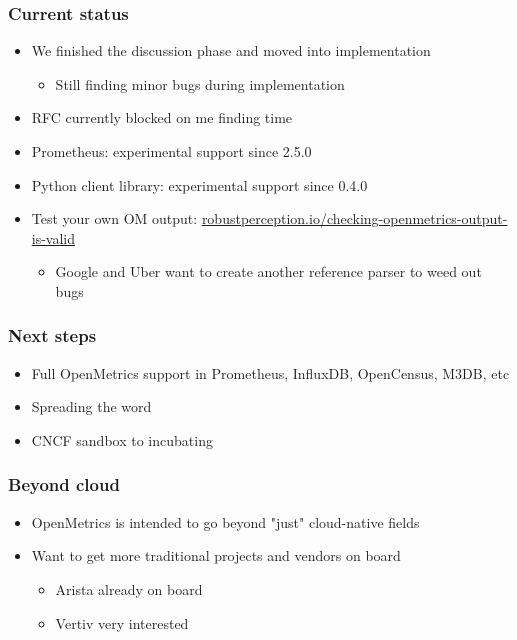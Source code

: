 \documentclass[aspectratio=169]{beamer}
\begin{document}
\begin{frame}
	\frametitle{Current status}
	\vfill
	\begin{itemize}
		\item We finished the discussion phase and moved into implementation
		\begin{itemize}
			\item Still finding minor bugs during implementation
		\end{itemize}
		\item RFC currently blocked on me finding time
		\item Prometheus: experimental support since 2.5.0
		\item Python client library: experimental support since 0.4.0
		\item Test your own OM output: \url{robustperception.io/checking-openmetrics-output-is-valid}
		\begin{itemize}
			\item Google and Uber want to create another reference parser to weed out bugs
		\end{itemize}
	\end{itemize}
	\vfill
\end{frame}

\begin{frame}
	\frametitle{Next steps}
	\vfill
	\begin{itemize}
		\item Full OpenMetrics support in Prometheus, InfluxDB, OpenCensus, M3DB, etc
		\item Spreading the word
		\item CNCF sandbox to incubating
	\end{itemize}
	\vfill
\end{frame}

\begin{frame}
	\frametitle{Beyond cloud}
	\vfill
	\begin{itemize}
		\item OpenMetrics is intended to go beyond "just" cloud-native fields
		\item Want to get more traditional projects and vendors on board
		\begin{itemize}
			\item Arista already on board
			\item Vertiv very interested
		\end{itemize}
	\end{itemize}
	\vfill
\end{frame}
\end{document}

